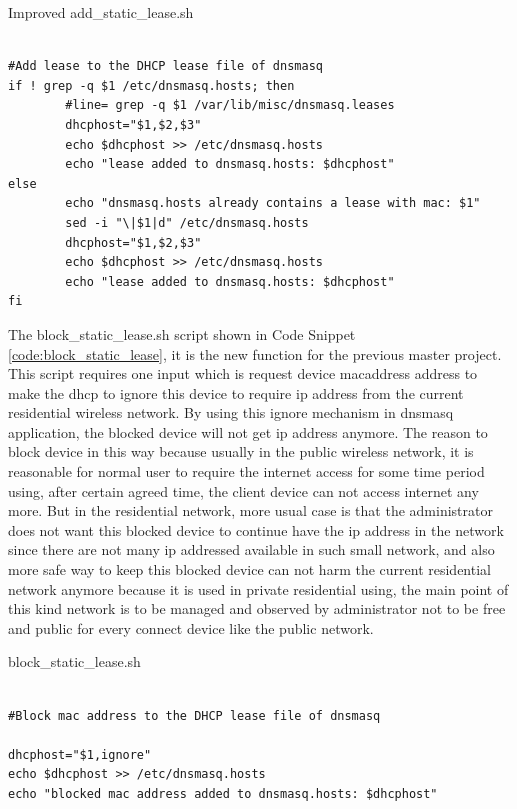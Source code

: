 \begin{algorithm}[h]
  \caption{Improved add\_static\_lease.sh}
  \label{code:add_static_lease}
  \begin{verbatim}
  
#Add lease to the DHCP lease file of dnsmasq
if ! grep -q $1 /etc/dnsmasq.hosts; then
        #line= grep -q $1 /var/lib/misc/dnsmasq.leases
        dhcphost="$1,$2,$3"
        echo $dhcphost >> /etc/dnsmasq.hosts
        echo "lease added to dnsmasq.hosts: $dhcphost"
else
        echo "dnsmasq.hosts already contains a lease with mac: $1"
        sed -i "\|$1|d" /etc/dnsmasq.hosts
        dhcphost="$1,$2,$3"
        echo $dhcphost >> /etc/dnsmasq.hosts
        echo "lease added to dnsmasq.hosts: $dhcphost"
fi
 \end{verbatim}
\end{algorithm}

\par The block\_static\_lease.sh script shown in Code Snippet \ref{code:block_static_lease}, it is the new function for the previous master project. This script requires one input which is request device \gls{macaddress} address to make the \gls{dhcp} to ignore this device to require \gls{ip} address from the current residential wireless network. By using this ignore mechanism in dnsmasq application, the blocked device will not get \gls{ip} address anymore. The reason to block device in this way because usually in the public wireless network, it is reasonable for normal user to require the internet access for some time period using, after certain agreed time, the client device can not access internet any more. But in the residential network, more usual case is that the administrator does not want this blocked device to continue have the \gls{ip} address in the network since there are not many \gls{ip} addressed available in such small network, and also more safe way to keep this blocked device can not harm the current residential network anymore because it is used in private residential using, the main point of this kind network is to be managed and observed by administrator not to be free and public for every connect device like the public network.

\begin{algorithm}[h]
  \caption{block\_static\_lease.sh}
  \label{code:block_static_lease}
  \begin{verbatim}
  
#Block mac address to the DHCP lease file of dnsmasq
        
dhcphost="$1,ignore"
echo $dhcphost >> /etc/dnsmasq.hosts
echo "blocked mac address added to dnsmasq.hosts: $dhcphost"
 \end{verbatim}
\end{algorithm}

